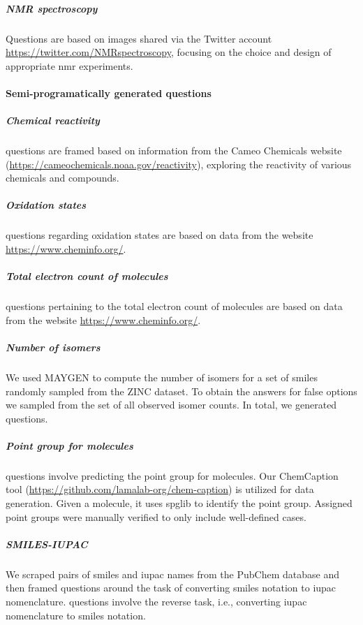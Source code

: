 \documentclass[11pt, oneside]{article}
\begin{document}
\begin{refsection}
\subparagraph{NMR spectroscopy}
Questions are based on images shared via the Twitter account \url{https://twitter.com/NMRspectroscopy}, focusing on the choice and design of appropriate \gls{nmr} experiments.


\paragraph{Semi-programatically generated questions}

\subparagraph{Chemical reactivity}
 questions are framed based on information from the Cameo Chemicals website (\url{https://cameochemicals.noaa.gov/reactivity}), exploring the reactivity of various chemicals and compounds.


\subparagraph{Oxidation states}
 questions regarding oxidation states are based on data from the website \url{https://www.cheminfo.org/}. 

\subparagraph{Total electron count of molecules}
 questions pertaining to the total electron count of molecules are based on data from the website \url{https://www.cheminfo.org/}. 

\subparagraph{Number of isomers}
We used MAYGEN\autocite{Yirik_2021} to compute the number of isomers for a set of \gls{smiles} randomly sampled from the ZINC dataset.\autocite{Irwin_2012}
To obtain the answers for false options we sampled from the set of all observed isomer counts. In total, we generated  questions.

\subparagraph{Point group for molecules}
 questions involve predicting the point group for molecules. 
Our ChemCaption tool (\url{https://github.com/lamalab-org/chem-caption}) is utilized for data generation. 
Given a molecule, it uses spglib\autocite{spglib} to identify the point group. 
Assigned point groups were manually verified to only include well-defined cases.

\subparagraph{SMILES-IUPAC}
We scraped pairs of \gls{smiles} and \gls{iupac} names from the PubChem database \autocite{pubchem} and then framed  questions around the task of converting \gls{smiles} notation to \gls{iupac} nomenclature.
 questions involve the reverse task, i.e., converting \gls{iupac} nomenclature to \gls{smiles} notation.



\end{refsection}
\end{document}
